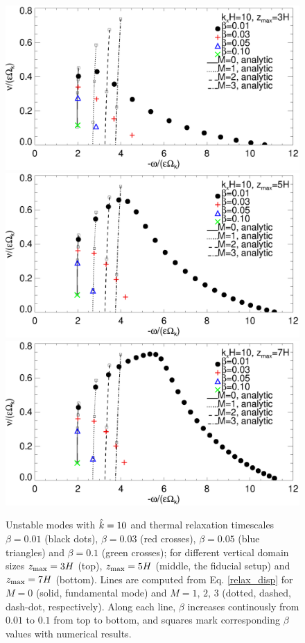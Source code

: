 \begin{figure}
  \includegraphics[width=\linewidth,clip=true,trim=0cm 1.75cm 0cm
  0cm]{figures/compare_modes_cool_kx10_z3_analytic.ps} 
  \includegraphics[width=\linewidth,clip=true,trim=0cm 1.75cm 0cm
  0cm]{figures/compare_modes_cool_kx10_z5_analytic.ps}
  \includegraphics[width=\linewidth]{figures/compare_modes_cool_kx10_z7_analytic.ps}
  \caption{Unstable modes with $\hat{k}=10$ and thermal
    relaxation timescales $\beta=0.01$ (black dots), $\beta=0.03$ (red
    crosses), $\beta=0.05$ (blue triangles) and $\beta=0.1$ (green 
    crosses); for different vertical domain sizes $z_\mathrm{max}=3H$ (top),
    $z_\mathrm{max}=5H$ (middle, the fiducial setup) and $z_\mathrm{max}=7H$
    (bottom). Lines are computed from
    Eq. \ref{relax_disp} for  $M=0$ (solid, fundamental mode) and
    $M=1,\,2,\,3$ (dotted, dashed, dash-dot, respectively). Along each
    line, $\beta$ increases continously from $0.01$ to $0.1$ from top
    to bottom, and squares mark corresponding $\beta$ values with
    numerical results. 
    \label{compare_modes_cool_kx10} 
  }
\end{figure}

